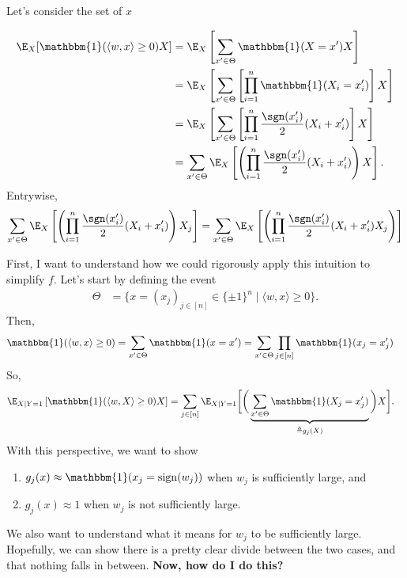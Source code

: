 \documentclass{article}
\begin{document}
Let's consider the set of $x$



\begin{align}
  \E_X[ \mathbbm{1}(\langle w, x \rangle \geq 0) X ]
  &= \E_X\left[ \sum_{ x' \in \Theta } \mathbbm{1}(X = x') X\right] \\
  &= \E_X\left[ \sum_{ x' \in \Theta } \left[\prod_{i=1}^{n} \mathbbm{1}(X_i = x_i')\right] X\right] \\
  &= \E_X\left[ \sum_{ x' \in \Theta } \left[\prod_{i=1}^{n} \frac{\sgn(x_i')}{2}( X_i + x_i' ) \right] X\right] \\
  &= \sum_{ x' \in \Theta } \E_X\left[ \left(\prod_{i=1}^{n} \frac{\sgn(x_i')}{2}( X_i + x_i' )\right) X\right].
\end{align}
Entrywise,
\begin{align*}
  \sum_{ x' \in \Theta } \E_X\left[ \left(\prod_{i=1}^{n} \frac{\sgn(x_i')}{2}( X_i + x_i' )\right) X_j \right]
  &= \sum_{ x' \in \Theta } \E_X\left[ \left(\prod_{i=1}^{n} \frac{\sgn(x_i')}{2}( X_i + x_i' ) X_j \right) \right] \\
\end{align*}

First, I want to understand how we could rigorously apply this intuition to simplify $f$.
Let's start by defining the event
\begin{align}
  \Theta
  &= \big\{ x = (x_j)_{j\in[n]} \in \{ \pm 1 \}^n \mid \langle w, x \rangle \geq 0 \big\}.
\end{align}
Then,
\begin{align}
  \mathbbm{1}(\langle w, x \rangle \geq 0)
  &= \sum_{ x' \in \Theta } \mathbbm{1}(x = x')
  = \sum_{ x' \in \Theta } \prod_{j \in [n]} \mathbbm{1}(x_j = x_j')
\end{align}
So,
\begin{align}
  \E_{X \mid Y=1}\left[ \mathbbm{1}(\langle w, X \rangle \geq 0) X \right]
  &= \sum_{j \in [n]} \E_{X \mid Y=1}\bigg[ \bigg( \underbrace{ \sum_{ x' \in \Theta } \mathbbm{1}(X_j = x_j') }_{\triangleq g_j(X)} \bigg) X \bigg].
\end{align}
With this perspective, we want to show
\begin{enumerate}
  \item $g_j(x) \approx \mathbbm{1}(x_j = \operatorname{sign}(w_j))$ when $w_j$ is sufficiently large, and
  \item $g_j(x) \approx 1$ when $w_j$ is not sufficiently large.
\end{enumerate}
We also want to understand what it means for $w_j$ to be sufficiently large.
Hopefully, we can show there is a pretty clear divide between the two cases, and that nothing falls in between.
\textbf{Now, how do I do this?}
\end{document}
